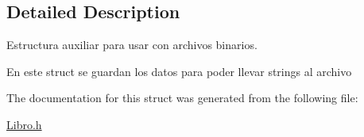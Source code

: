 \subsection{Detailed Description}
Estructura auxiliar para usar con archivos binarios. 

En este struct se guardan los datos para poder llevar strings al archivo 

The documentation for this struct was generated from the following file\+:\begin{DoxyCompactItemize}
\item 
\hyperlink{_libro_8h}{Libro.\+h}\end{DoxyCompactItemize}
